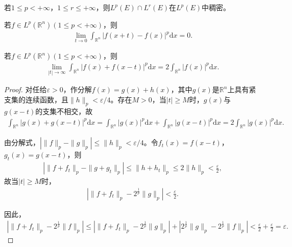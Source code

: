 \documentclass[../../main.tex]{subfiles}%
\begin{document}
\begin{corollary}
若$1\leqslant p<+\infty$，$1\leqslant r\leqslant+\infty$，则$L^p(E)\cap L^r(E)$在$L^p(E)$中稠密。
\end{corollary}

\begin{theorem}
若$f\in L^p(\mathbb{R}^n)(1\leqslant p<+\infty)$，则
\begin{align}
\lim\limits_{t\to0}\int_{\mathbb{R}^n}|f(x+t)-f(x)|^p\mathrm{d}x=0.\label{eq::--9ru90RFUJIJR3ruu0-5}
\end{align}
\end{theorem}

\begin{example}
若$f\in L^p(\mathbb{R}^n)(1\leqslant p<+\infty)$，则
\begin{align*}
\lim\limits_{|t|\to\infty}\int_{\mathbb{R}^n}|f(x)+f(x-t)|^p\mathrm{d}x=2\int_{\mathbb{R}^n}|f(x)|^p\mathrm{d}x.
\end{align*}
\end{example}

\begin{proof}

对任给$\varepsilon>0$，作分解$f(x)=g(x)+h(x)$，其中$g(x)$是$\mathbb{R}^n$上具有紧支集的连续函数，且$\|h\|_p<\varepsilon/4$。存在$M>0$，当$|t|\geqslant M$时，$g(x)$与$g(x-t)$的支集不相交，故
\begin{align*}
\int_{\mathbb{R}^n}|g(x)+g(x-t)|^p\mathrm{d}x=\int_{\mathbb{R}^n}|g(x)|^p\mathrm{d}x+\int_{\mathbb{R}^n}|g(x-t)|^p\mathrm{d}x=2\int_{\mathbb{R}^n}|g(x)|^p\mathrm{d}x.
\end{align*}

由分解式，$|\|f\|_p-\|g\|_p|\leqslant\|h\|_p<\varepsilon/4$。令$f_t(x)=f(x-t)$，$g_t(x)=g(x-t)$，则
\begin{align*}
|\|f+f_t\|_p-\|g+g_t\|_p|\leqslant\|h+h_t\|_p\leqslant2\|h\|_p<\frac{\varepsilon}{2},
\end{align*}
故当$|t|\geqslant M$时，
\begin{align*}
|\|f+f_t\|_p-2^{\frac{1}{p}}\|g\|_p|<\frac{\varepsilon}{2}.
\end{align*}

因此，
\begin{align*}
|\|f+f_t\|_p-2^{\frac{1}{p}}\|f\|_p|\leqslant|\|f+f_t\|_p-2^{\frac{1}{p}}\|g\|_p|+|2^{\frac{1}{p}}\|g\|_p-2^{\frac{1}{p}}\|f\|_p|
<\frac{\varepsilon}{2}+\frac{\varepsilon}{2}=\varepsilon.
\end{align*}

\end{proof}
\end{document}
